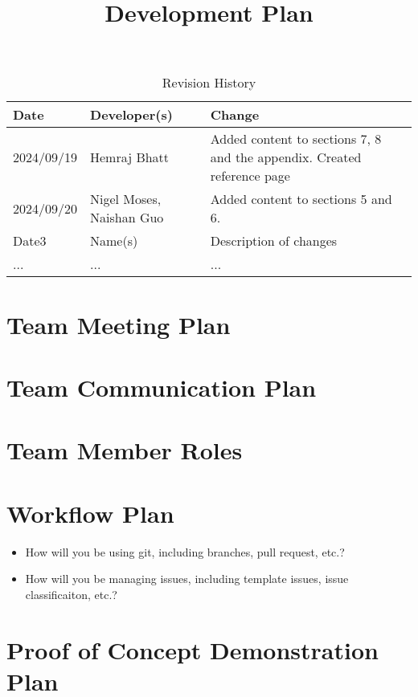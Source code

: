 \documentclass{article}
\title{Development Plan\\\progname}
\author{\authname}
\date{}
\begin{document}
\maketitle

\begin{table}[hp]
\caption{Revision History} \label{TblRevisionHistory}
\begin{tabularx}{\textwidth}{llX}
\toprule
\textbf{Date} & \textbf{Developer(s)} & \textbf{Change}\\
\midrule
2024/09/19 & Hemraj Bhatt & Added content to sections 7, 8 and the appendix. Created reference page\\
2024/09/20 & Nigel Moses, Naishan Guo & Added content to sections 5 and 6.\\
Date3 & Name(s) & Description of changes\\
... & ... & ...\\
\bottomrule
\end{tabularx}
\end{table}


\section{Team Meeting Plan}

\section{Team Communication Plan}

\section{Team Member Roles}

\section{Workflow Plan}

\begin{itemize}
	\item How will you be using git, including branches, pull request, etc.?
	\item How will you be managing issues, including template issues, issue
	classificaiton, etc.?
\end{itemize}

\section{Proof of Concept Demonstration Plan}
\end{document}
